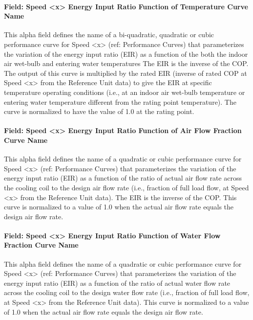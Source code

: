 \paragraph{Field: Speed \textless{}x\textgreater{} Energy Input Ratio Function of Temperature Curve Name}\label{field-speed-x-energy-input-ratio-function-of-temperature-curve-name-4}

This alpha field defines the name of a bi-quadratic, quadratic or cubic performance curve for Speed \textless{}x\textgreater{} (ref: Performance Curves) that parameterizes the variation of the energy input ratio (EIR) as a function of the both the indoor air wet-bulb and entering water temperatures The EIR is the inverse of the COP. The output of this curve is multiplied by the rated EIR (inverse of rated COP at Speed \textless{}x\textgreater{} from the Reference Unit data) to give the EIR at specific temperature operating conditions (i.e., at an indoor air wet-bulb temperature or entering water temperature different from the rating point temperature). The curve is normalized to have the value of 1.0 at the rating point.

\paragraph{Field: Speed \textless{}x\textgreater{} Energy Input Ratio Function of Air Flow Fraction Curve Name}\label{field-speed-x-energy-input-ratio-function-of-air-flow-fraction-curve-name-2}

This alpha field defines the name of a quadratic or cubic performance curve for Speed \textless{}x\textgreater{} (ref: Performance Curves) that parameterizes the variation of the energy input ratio (EIR) as a function of the ratio of actual air flow rate across the cooling coil to the design air flow rate (i.e., fraction of full load flow, at Speed \textless{}x\textgreater{} from the Reference Unit data). The EIR is the inverse of the COP. This curve is normalized to a value of 1.0 when the actual air flow rate equals the design air flow rate.

\paragraph{Field: Speed \textless{}x\textgreater{} Energy Input Ratio Function of Water Flow Fraction Curve Name}\label{field-speed-x-energy-input-ratio-function-of-water-flow-fraction-curve-name}

This alpha field defines the name of a quadratic or cubic performance curve for Speed \textless{}x\textgreater{} (ref: Performance Curves) that parameterizes the variation of the energy input ratio (EIR) as a function of the ratio of actual water flow rate across the cooling coil to the design water flow rate (i.e., fraction of full load flow, at Speed \textless{}x\textgreater{} from the Reference Unit data). This curve is normalized to a value of 1.0 when the actual air flow rate equals the design air flow rate.

